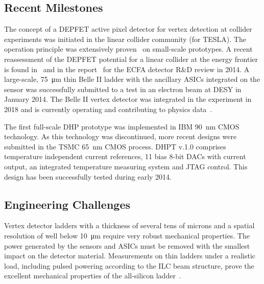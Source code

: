 \subsection{Recent Milestones}
The concept of a DEPFET active pixel detector for vertex detection at collider experiments was initiated in the linear collider community (for TESLA).
The operation principle was extensively proven~\cite{Andricek:2011zza,Velthuis:2008zza} on small-scale prototypes. A recent reassessment of the DEPFET potential for a linear collider at the energy frontier is found in~\cite{6484214} and in the report~\cite{depfet:ecfaReport} for the ECFA detector R\&D review in 2014.
A large-scale, \SI{75}{\micro\meter} thin Belle II ladder with the ancillary ASICs integrated on the sensor was successfully submitted to a test in an electron beam at DESY in January 2014\cite{Marinas:2014iza}. The Belle II vertex detector was integrated in the experiment in 2018 and is currently operating and contributing to physics data~\cite{Schwenker:2017kcf,Paschen:2019sit,Abudinen:2019rkl}. 


The first full-scale DHP prototype was implemented in IBM \SI{90}{nm} CMOS technology. As this technology was discontinued, more recent designs were submitted in the TSMC \SI{65}{nm} CMOS process. DHPT v.1.0 comprises temperature independent current references, 11 bias 8-bit DACs with current output, an integrated temperature measuring system and JTAG control. This design has been successfully tested during early 2014\cite{Kishishita:2014maa}.

\subsection{Engineering Challenges}
Vertex detector ladders with a thickness of several tens of microns and a spatial resolution of well below \SI{10}{\micro\meter} require very robust mechanical properties. The power generated by the sensors and ASICs must be removed with the smallest impact on the detector material.
Measurements on thin ladders under a realistic load, including pulsed powering according to the ILC beam structure, prove the excellent mechanical properties of the all-silicon ladder~\cite{thermomech}.

